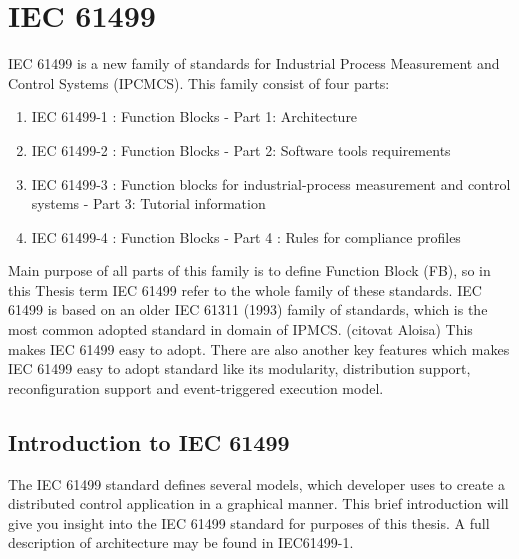 
\chapter{IEC 61499} %
\label{Chapter2} %




IEC 61499 is a new family of standards for Industrial Process Measurement and Control Systems (IPCMCS). This family consist of four parts:

\begin{enumerate}
	\item IEC 61499-1 : Function Blocks - Part 1: Architecture
	\item IEC 61499-2 : Function Blocks - Part 2: Software tools requirements
	\item IEC 61499-3 : Function blocks for industrial-process measurement and control systems - Part 3: Tutorial information 
	\item IEC 61499-4 : Function Blocks - Part 4 : Rules for compliance profiles
\end{enumerate}


Main purpose of all parts of this family is to define Function Block (FB), so in this Thesis term IEC 61499 refer to the whole family of these standards. 
IEC 61499 is based on an older IEC 61311 (1993) family of standards, which is the most common adopted standard in domain of IPMCS.  (citovat Aloisa)
This makes IEC 61499 easy to adopt. There are also another key features which makes IEC 61499 easy to adopt standard like its modularity, distribution support, reconfiguration support and event-triggered execution model. 

\section{Introduction to IEC 61499}

The IEC 61499 standard defines several models, which  developer uses to create a distributed control application in a graphical manner. This brief introduction will give you insight into the IEC 61499 standard for purposes of this thesis. A full description of architecture may be found in IEC61499-1.

